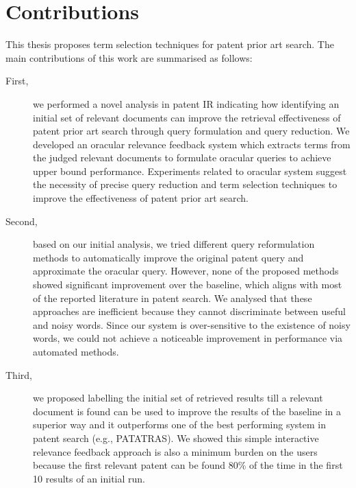 \section{Contributions}
\label{sec:Contributions}
This thesis proposes term selection techniques for patent prior art search.
The main contributions of this work are summarised as follows:
\begin{description}
\item[First,] we performed a novel analysis in patent IR indicating how identifying 
an initial set of relevant documents can improve the retrieval effectiveness of 
patent prior art search through query formulation and query reduction. 
We developed an oracular relevance feedback system which extracts terms from the 
judged relevant documents to formulate oracular queries to achieve upper bound performance. 
Experiments related to oracular system suggest the necessity of precise query reduction 
and term selection techniques to improve the effectiveness of patent prior art search.
\item[Second,] based on our initial analysis, we tried different query reformulation methods to 
automatically improve the original patent query and approximate the oracular query. 
However, none of the proposed methods showed significant improvement over the baseline, 
which aligns with most of the reported literature in patent search. 
We analysed that these approaches are inefficient because they cannot discriminate between 
useful and noisy words. Since our system is over-sensitive to the existence of noisy words, 
we could not achieve a noticeable improvement in performance via automated methods.
\item[Third,] we proposed labelling the initial set of retrieved results till a relevant document is 
found can be used to improve the results of the baseline in a superior way and it outperforms one of the 
best performing system in patent search (e.g., PATATRAS).
We showed this simple interactive relevance feedback approach is also a minimum burden on the users 
because the first relevant patent can be found 80\% of the time in the first 10 results of an initial run.
\end{description}
